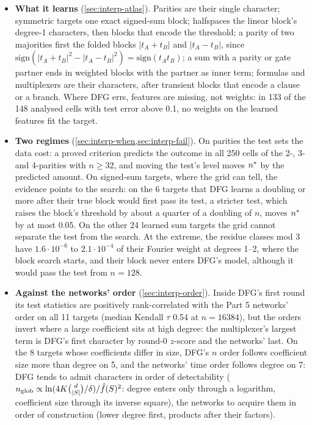\begin{itemize}
\item \textbf{What it learns}  (\cref{sec:interp-atlas}). Parities are their single character; symmetric targets one exact signed-sum block; halfspaces the linear block's degree-1 characters, then blocks that encode the threshold; a parity of two majorities first the folded blocks $|t_A+t_B|$ and $|t_A-t_B|$, since $\mathrm{sign}(|t_A+t_B|^2-|t_A-t_B|^2)=\mathrm{sign}(t_At_B)$; a sum with a parity or gate partner ends in weighted blocks with the partner as inner term; formulas and multiplexers are their characters, after transient blocks that encode a clause or a branch. Where DFG errs, features are missing, not weights: in 133 of the 148 analysed cells with test error above 0.1, no weights on the learned features fit the target.
\item \textbf{Two regimes}  (\cref{sec:interp-when,sec:interp-fail}). On parities the test sets the data cost: a proved criterion predicts the outcome in all 250 cells of the 2-, 3- and 4-parities with $n\ge32$, and moving the test's level moves $n^{*}$ by the predicted amount. On signed-sum targets, where the grid can tell, the evidence points to the search: on the 6 targets that DFG learns a doubling or more after their true block would first pass its test, a stricter test, which raises the block's threshold by about a quarter of a doubling of $n$, moves $n^{*}$ by at most 0.05. On the other 24 learned sum targets the grid cannot separate the test from the search. At the extreme, the residue classes mod 3 have $1.6\cdot10^{-6}$ to $2.1\cdot10^{-4}$ of their Fourier weight at degrees 1--2, where the block search starts, and their block never enters DFG's model, although it would pass the test from $n=128$.
\item \textbf{Against the networks' order}  (\cref{sec:interp-order}). Inside DFG's first round its test statistics are positively rank-correlated with the Part 5 networks' order on all 11 targets (median Kendall $\tau$ 0.54 at $n=16384$), but the orders invert where a large coefficient sits at high degree: the multiplexer's largest term is DFG's first character by round-0 $z$-score and the networks' last. On the 8 targets whose coefficients differ in size, DFG's $n$ order follows coefficient size more than degree on 5, and the networks' time order follows degree on 7: DFG tends to admit characters in order of detectability ($n_{\rm glob}\propto\ln(4K\binom d{|S|}/\delta)/\hat f(S)^2$: degree enters only through a logarithm, coefficient size through its inverse square), the networks to acquire them in order of construction (lower degree first, products after their factors).
\end{itemize}

